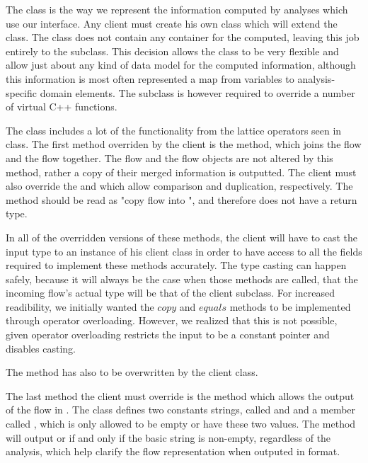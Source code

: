 The  class is the way we represent the information computed by analyses which use our interface. Any client must create his own class which will extend the  class. The class does not contain any container for the computed, leaving this job entirely to the subclass. This decision allows the class to be very flexible and allow just about any kind of data model for the computed information, although this information is most often represented a map from variables to analysis-specific domain elements. The subclass is however required to override a number of virtual C++ functions.

The  class includes a lot of the functionality from the lattice operators seen in class. The first method overriden by the client is the  method, which joins the  flow and the  flow together. The  flow and the  flow objects are not altered by this method, rather a copy of their merged information is outputted. The client must also override the  and  which allow comparison and duplication, respectively. The  method should be read as "copy flow  into ", and therefore does not have a return type.

In all of the overridden versions of these methods, the client will have to cast the input  type to an instance of his client class in order to have access to all the fields required to implement these methods accurately. The type casting can happen safely, because it will always be the case when those methods are called, that the incoming flow's actual type will be that of the client subclass. For increased readibility, we initially wanted the $copy$ and $equals$ methods to be implemented through operator overloading. However, we realized that this is not possible, given operator overloading restricts the input to be a constant pointer and disables casting.

The  method has also to be overwritten by the client class.

The last method the client must override is the  method which allows the output of the flow in . The class defines two constants strings, called  and  and a member called , which is only allowed to be empty or have these two values. The  method will output  or  if and only if the basic string is non-empty, regardless of the analysis, which help clarify the flow representation when outputed in  format.

